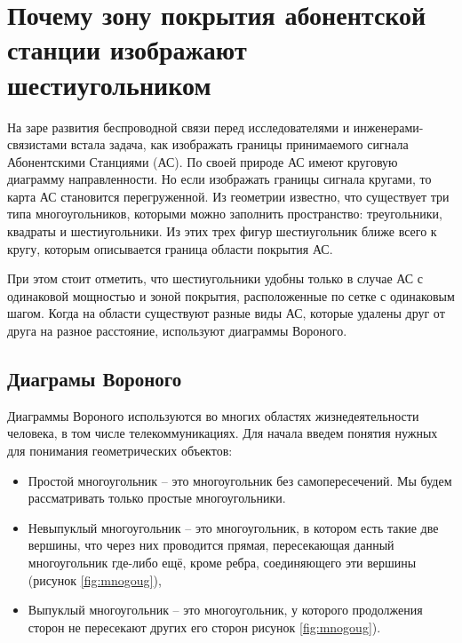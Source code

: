 \section{Почему зону покрытия абонентской станции изображают шестиугольником}



На заре развития беспроводной связи перед исследователями и инженерами-связистами встала задача, как изображать границы принимаемого сигнала Абонентскими Станциями (АС). По своей природе АС имеют круговую диаграмму направленности. Но если изображать границы сигнала кругами, то карта АС становится перегруженной. Из геометрии известно, что существует три типа многоугольников, которыми можно заполнить пространство: треугольники, квадраты и шестиугольники. Из этих трех фигур шестиугольник ближе всего к кругу, которым описывается граница области покрытия АС. 

При этом стоит отметить, что шестиугольники удобны только в случае АС с одинаковой мощностью и зоной покрытия, расположенные по сетке с одинаковым шагом. Когда на области существуют разные виды АС, которые удалены друг от друга на разное расстояние, используют диаграммы Вороного. 

\subsection{Диаграмы Вороного}

Диаграммы Вороного используются во многих областях жизнедеятельности человека, в том числе телекоммуникациях. Для начала введем понятия нужных для понимания геометрических объектов:

\begin{itemize}
	\item Простой многоугольник -- это многоугольник без самопересечений. Мы будем рассматривать только простые многоугольники.
	\item Невыпуклый многоугольник -- это многоугольник, в котором есть такие две вершины, что через них проводится прямая, пересекающая данный многоугольник где-либо ещё, кроме ребра, соединяющего эти вершины (рисунок \ref{fig:mnogoug}), 
	\item Выпуклый многоугольник -- это многоугольник, у которого продолжения сторон не пересекают других его сторон рисунок \ref{fig:mnogoug}).
\end{itemize}

